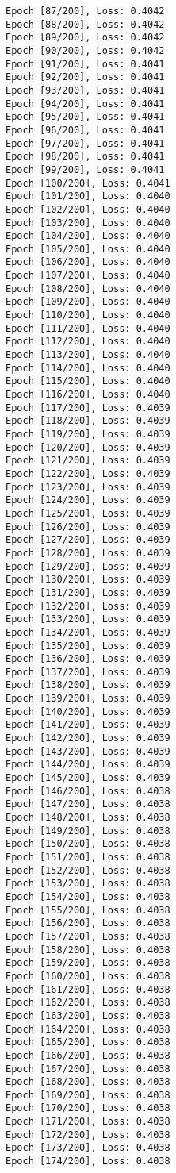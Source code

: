 \documentclass[11pt]{article}
\begin{document}
\begin{Verbatim}[commandchars=\\\{\}]
Epoch [87/200], Loss: 0.4042
Epoch [88/200], Loss: 0.4042
Epoch [89/200], Loss: 0.4042
Epoch [90/200], Loss: 0.4042
Epoch [91/200], Loss: 0.4041
Epoch [92/200], Loss: 0.4041
Epoch [93/200], Loss: 0.4041
Epoch [94/200], Loss: 0.4041
Epoch [95/200], Loss: 0.4041
Epoch [96/200], Loss: 0.4041
Epoch [97/200], Loss: 0.4041
Epoch [98/200], Loss: 0.4041
Epoch [99/200], Loss: 0.4041
Epoch [100/200], Loss: 0.4041
Epoch [101/200], Loss: 0.4040
Epoch [102/200], Loss: 0.4040
Epoch [103/200], Loss: 0.4040
Epoch [104/200], Loss: 0.4040
Epoch [105/200], Loss: 0.4040
Epoch [106/200], Loss: 0.4040
Epoch [107/200], Loss: 0.4040
Epoch [108/200], Loss: 0.4040
Epoch [109/200], Loss: 0.4040
Epoch [110/200], Loss: 0.4040
Epoch [111/200], Loss: 0.4040
Epoch [112/200], Loss: 0.4040
Epoch [113/200], Loss: 0.4040
Epoch [114/200], Loss: 0.4040
Epoch [115/200], Loss: 0.4040
Epoch [116/200], Loss: 0.4040
Epoch [117/200], Loss: 0.4039
Epoch [118/200], Loss: 0.4039
Epoch [119/200], Loss: 0.4039
Epoch [120/200], Loss: 0.4039
Epoch [121/200], Loss: 0.4039
Epoch [122/200], Loss: 0.4039
Epoch [123/200], Loss: 0.4039
Epoch [124/200], Loss: 0.4039
Epoch [125/200], Loss: 0.4039
Epoch [126/200], Loss: 0.4039
Epoch [127/200], Loss: 0.4039
Epoch [128/200], Loss: 0.4039
Epoch [129/200], Loss: 0.4039
Epoch [130/200], Loss: 0.4039
Epoch [131/200], Loss: 0.4039
Epoch [132/200], Loss: 0.4039
Epoch [133/200], Loss: 0.4039
Epoch [134/200], Loss: 0.4039
Epoch [135/200], Loss: 0.4039
Epoch [136/200], Loss: 0.4039
Epoch [137/200], Loss: 0.4039
Epoch [138/200], Loss: 0.4039
Epoch [139/200], Loss: 0.4039
Epoch [140/200], Loss: 0.4039
Epoch [141/200], Loss: 0.4039
Epoch [142/200], Loss: 0.4039
Epoch [143/200], Loss: 0.4039
Epoch [144/200], Loss: 0.4039
Epoch [145/200], Loss: 0.4039
Epoch [146/200], Loss: 0.4038
Epoch [147/200], Loss: 0.4038
Epoch [148/200], Loss: 0.4038
Epoch [149/200], Loss: 0.4038
Epoch [150/200], Loss: 0.4038
Epoch [151/200], Loss: 0.4038
Epoch [152/200], Loss: 0.4038
Epoch [153/200], Loss: 0.4038
Epoch [154/200], Loss: 0.4038
Epoch [155/200], Loss: 0.4038
Epoch [156/200], Loss: 0.4038
Epoch [157/200], Loss: 0.4038
Epoch [158/200], Loss: 0.4038
Epoch [159/200], Loss: 0.4038
Epoch [160/200], Loss: 0.4038
Epoch [161/200], Loss: 0.4038
Epoch [162/200], Loss: 0.4038
Epoch [163/200], Loss: 0.4038
Epoch [164/200], Loss: 0.4038
Epoch [165/200], Loss: 0.4038
Epoch [166/200], Loss: 0.4038
Epoch [167/200], Loss: 0.4038
Epoch [168/200], Loss: 0.4038
Epoch [169/200], Loss: 0.4038
Epoch [170/200], Loss: 0.4038
Epoch [171/200], Loss: 0.4038
Epoch [172/200], Loss: 0.4038
Epoch [173/200], Loss: 0.4038
Epoch [174/200], Loss: 0.4038

\end{Verbatim}
\end{document}
